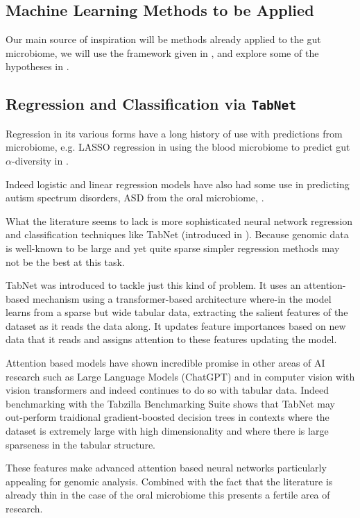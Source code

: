 \documentclass{article}
\begin{document}
\begin{multicols}{2}
\section{Machine Learning Methods to be Applied} 
Our main source of inspiration will be methods already applied to the gut microbiome, we will use the framework given in \cite{li_machine_2022}, and explore some of the hypotheses in \cite{tao_relationship_2024}.
\subsection{Regression and Classification via \texttt{TabNet}}
Regression in its various forms have a long history of use with predictions from microbiome, e.g. LASSO regression in using the blood microbiome to predict gut $\alpha$-diversity in \cite{wilmanski_blood_2019}. 

Indeed logistic and linear regression models have also had some use in predicting autism spectrum disorders, ASD from the oral microbiome, \cite{li_genetic_2022}. 

What the literature seems to lack is more sophisticated neural network regression and classification techniques like TabNet (introduced in \cite{arik_tabnet_2021}). Because genomic data is well-known to be large and yet quite sparse simpler regression methods may not be the best at this task. 

TabNet was introduced to tackle just this kind of problem. It uses an attention-based mechanism using a transformer-based \cite{vaswani_attention_2017} architecture where-in the model learns from a sparse but wide tabular data, extracting the salient features of the dataset as it reads the data along. It updates feature importances based on new data that it reads and assigns attention to these features updating the model. 

Attention based models have shown incredible promise in other areas of AI research such as Large Language Models (ChatGPT) and in computer vision with vision transformers and indeed continues to do so with tabular data. Indeed benchmarking with the Tabzilla Benchmarking Suite \cite{mcelfresh2023neural} shows that TabNet may out-perform traidional gradient-boosted decision trees in contexts where the dataset is extremely large with high dimensionality and where there is large sparseness in the tabular structure.

These features make advanced attention based neural networks particularly appealing for genomic analysis. Combined with the fact that the literature is already thin in the case of the oral microbiome this presents a fertile area of research. 


\end{multicols}
\end{document}
